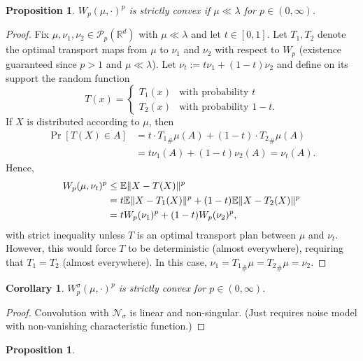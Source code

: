 \documentclass{article}
\newtheorem{proposition}[theorem]{Proposition}
\newtheorem{corollary}[theorem]{Corollary}
\newcommand{\R}{\mathbb{R}}
\newcommand{\E}{\mathbb{E}}
\newcommand{\N}{\mathcal{N}}
\renewcommand{\P}{\mathcal{P}}
\DeclarePairedDelimiter{\norm}{\lVert}{\rVert}
\begin{document}
\begin{proposition}
    $W_p(\mu,\cdot)^p$ is strictly convex if $\mu \ll \lambda$ for $p \in (0,\infty)$.
\end{proposition}
\begin{proof}
    Fix $\mu,\nu_1,\nu_2 \in \P_p(\R^d)$ with $\mu \ll \lambda$ and let $t \in [0,1]$. Let $T_1, T_2$ denote the optimal transport maps from $\mu$ to $\nu_1$ and $\nu_2$ with respect to $W_p$ (existence guaranteed since $p > 1$ and $\mu \ll \lambda$). Let $\nu_t := t \nu_1 + (1-t) \nu_2$ and define on its support the random function
    \begin{equation*}
        T(x) = \begin{cases}
            T_1(x) & \text{with probability $t$}\\
            T_2(x) & \text{with probability $1-t$}.
        \end{cases}
    \end{equation*}
    If $X$ is distributed according to $\mu$, then
    \begin{align*}
        \Pr[T(X) \in A] &= t \cdot {T_1}_\#\mu(A) + (1 - t) \cdot {T_2}_\#\mu(A)\\
        &= t \nu_1(A) + (1-t) \nu_2(A) = \nu_t(A).
    \end{align*}
    Hence,
    \begin{align*}
        W_p(\mu,\nu_t)^p &\leq \E \norm{X - T(X)}^p\\
        &= t \E \norm{X - T_1(X)}^p + (1 - t) \E \norm{X - T_2(X)}^p\\
        &= t W_p(\nu_1)^p + (1-t) W_p(\nu_2)^p,
    \end{align*}
    with strict inequality unless $T$ is an optimal transport plan between $\mu$ and $\nu_t$. However, this would force $T$ to be deterministic (almost everywhere), requiring that $T_1 = T_2$ (almost everywhere). In this case, $\nu_1 = {T_1}_\# \mu = {T_2}_\# \mu = \nu_2$.
\end{proof}

\begin{corollary}
    $W_p^\sigma(\mu,\cdot)^p$ is strictly convex for $p \in (0,\infty)$.
\end{corollary}
\begin{proof}
    Convolution with $\N_\sigma$ is linear and non-singular. (Just requires noise model with non-vanishing characteristic function.)
\end{proof}

\begin{proposition}

\end{proposition}
\end{document}
